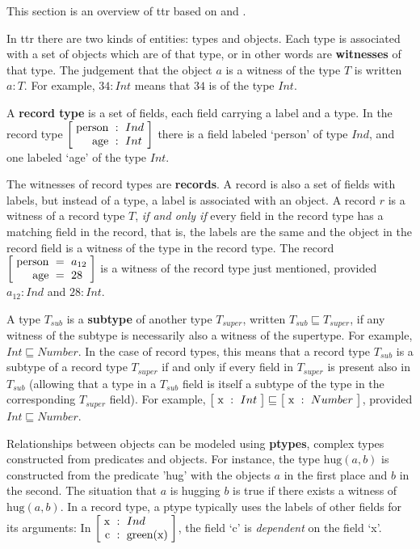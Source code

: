 This section is an overview of \gls{ttr} based on \cite{CooperTypetheorysemantics2012} and \cite{CooperTypetheorylanguage2016}.

In \gls{ttr} there are two kinds of entities: types and objects.
Each type is associated with a set of objects which are of that type, or in other words are \textbf{witnesses} of that type.
The judgement that the object $a$ is a witness of the type $T$ is written $a : T$.
For example, $34 : Int$ means that $34$ is of the type $Int$.

A \textbf{record type} is a set of fields, each field carrying a label and a type.
In the record type $\rec{\text{person} &:& Ind \\ \text{age} &:& Int}$ there is a field labeled `person' of type $Ind$, and one labeled `age' of the type $Int$.

The witnesses of record types are \textbf{records}.
A record is also a set of fields with labels, but instead of a type, a label is associated with an object.
A record $r$ is a witness of a record type $T$, \textit{if and only if} every field in the record type has a matching field in the record, that is, the labels are the same and the object in the record field is a witness of the type in the record type.
The record $\rec{\text{person} &=& a_{12} \\ \text{age} &=& 28}$ is a witness of the record type just mentioned, provided $a_{12} : Ind$ and $28 : Int$.


A type $T_{sub}$ is a \textbf{subtype} of another type $T_{super}$, written $T_{sub} \sqsubseteq T_{super}$, if any witness of the subtype is necessarily also a witness of the supertype.
For example, $Int \sqsubseteq Number$.
In the case of record types, this means that a record type $T_{sub}$ is a subtype of a record type $T_{super}$ if and only if every field in $T_{super}$ is present also in $T_{sub}$ (allowing that a type in a $T_{sub}$ field is itself a subtype of the type in the corresponding $T_{super}$ field).
For example, $\rec{\text{x} &:& Int} \sqsubseteq \rec{\text{x} &:& Number}$, provided $Int \sqsubseteq Number$.

Relationships between objects can be modeled using \textbf{ptypes}, complex types constructed from predicates and objects.
For instance, the type $\text{hug}(a,b)$ is constructed from the predicate 'hug' with the objects $a$ in the first place and $b$ in the second.
The situation that $a$ is hugging $b$ is true if there exists a witness of $\text{hug}(a,b)$.
In a record type, a ptype typically uses the labels of other fields for its arguments:
In $\rec{\text{x} &:& Ind \\ \text{c} &:& \text{green}(\text{x})}$, the field `c' is \textit{dependent} on the field `x'.

